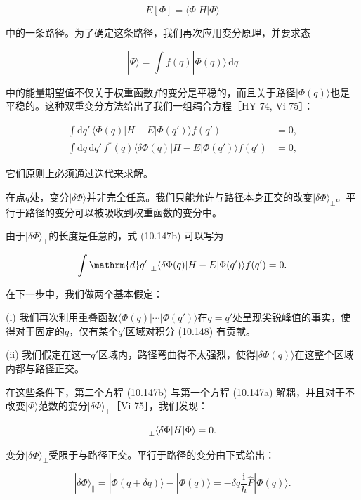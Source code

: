 \[
E[\Phi]=\langle\Phi|H|\Phi\rangle
\]

中的一条路径。为了确定这条路径，我们再次应用变分原理，并要求态

\begin{equation}
|\Psi\rangle=\int f(q)|\Phi(q)\rangle\,\mathrm{d}q\label{eq:10.146}
\end{equation}

中的能量期望值不仅关于权重函数$f$的变分是平稳的，而且关于路径$|\Phi(q)\rangle$也是平稳的。这种双重变分方法给出了我们一组耦合方程［HY
74, Vi 75］：

\begin{align}
\int\mathrm{d}q'\,\langle\Phi(q)|H-E|\Phi(q')\rangle f(q') & =0,\label{eq:10.147a}\\
\int\mathrm{d}q\,\mathrm{d}q'\,f^{*}(q)\langle\delta\Phi(q)|H-E|\Phi(q')\rangle f(q') & =0,\label{eq:10.147b}
\end{align}

它们原则上必须通过迭代来求解。

在点$q$处，变分$|\delta\Phi\rangle$并非完全任意。我们只能允许与路径本身正交的改变$|\delta\Phi\rangle_{\perp}$。平行于路径的变分可以被吸收到权重函数的变分中。

由于$|\delta\Phi\rangle_{\perp}$的长度是任意的，式 (10.147b) 可以写为

\begin{equation}
\int\mathrm{d}q'\,\prescript{}{\perp}{\langle}\delta\Phi(q)|H-E|\Phi(q')\rangle f(q')=0.\label{eq:10.148}
\end{equation}

在下一步中，我们做两个基本假定：

(i) 我们再次利用重叠函数$\langle\Phi(q)|\cdots|\Phi(q')\rangle$在$q=q'$处呈现尖锐峰值的事实，使得对于固定的$q$，仅有某个$q'$区域对积分
(10.148) 有贡献。

(ii) 我们假定在这一$q'$区域内，路径弯曲得不太强烈，使得$|\delta\Phi(q)\rangle$在这整个区域内都与路径正交。

在这些条件下，第二个方程 (10.147b) 与第一个方程 (10.147a) 解耦，并且对于不改变$|\Phi\rangle$范数的变分$|\delta\Phi\rangle_{\perp}$［Vi
75］，我们发现：

\begin{equation}
\prescript{}{\perp}{\langle}\delta\Phi|H|\Phi\rangle=0.\label{eq:10.149}
\end{equation}

变分$|\delta\Phi\rangle_{\perp}$受限于与路径正交。平行于路径的变分由下式给出：

\begin{equation}
|\delta\Phi\rangle_{\parallel}=|\Phi(q+\delta q)\rangle-|\Phi(q)\rangle=-\delta q\frac{\mathrm{i}}{\hbar}\hat{P}|\Phi(q)\rangle.\label{eq:10.150}
\end{equation}

